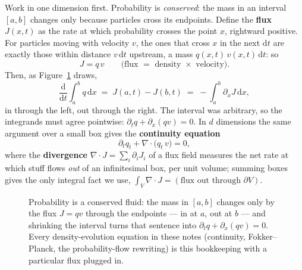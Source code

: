 \documentclass[10pt,a4paper]{article}
\newcommand{\dd}{\mathrm{d}}
\begin{document}
Work in one dimension first. Probability is \emph{conserved}: the mass
in an interval $[a, b]$ changes only because particles cross its
endpoints. Define the \textbf{flux} $J(x, t)$ as the rate at which
probability crosses the point $x$, rightward positive. For particles
moving with velocity $v$, the ones that cross $x$ in the next $\dd t$
are exactly those within distance $v\,\dd t$ upstream, a mass
$q(x,t)\, v(x,t)\, \dd t$: so
\begin{equation}
J = q\, v \qquad \text{(flux $=$ density $\times$ velocity).}
\end{equation}
Then, as Figure~\ref{fig:flux} draws,
\begin{equation}
\frac{\dd}{\dd t} \int_a^b q\, \dd x
\;=\; J(a, t) - J(b, t)
\;=\; -\int_a^b \partial_x J\, \dd x ,
\end{equation}
in through the left, out through the right. The interval was arbitrary,
so the integrands must agree pointwise:
$\partial_t q + \partial_x (q v) = 0$. In $d$ dimensions the same
argument over a small box gives the \textbf{continuity equation}
\begin{equation}
\boxed{\;\partial_t q_t + \nabla\!\cdot\!\big( q_t\, v \big) = 0,\;}
\label{eq:continuity}
\end{equation}
where the \textbf{divergence} $\nabla\!\cdot\!J = \sum_i \partial_i J_i$
of a flux field measures the net rate at which stuff flows \emph{out} of
an infinitesimal box, per unit volume; summing boxes gives the only
integral fact we use,
$\int_V \nabla\!\cdot\!J = (\text{flux out through } \partial V)$.

\begin{figure}[t]
\centering
{}
\caption{Probability is a conserved fluid: the mass in $[a, b]$ changes only by
the flux $J = qv$ through the endpoints --- in at $a$, out at $b$ ---
and shrinking the interval turns that sentence into
$\partial_t q + \partial_x(qv) = 0$. Every density-evolution equation in
these notes (continuity, Fokker--Planck, the probability-flow
rewriting) is this bookkeeping with a particular flux plugged in.}
\label{fig:flux}
\end{figure}
\end{document}
